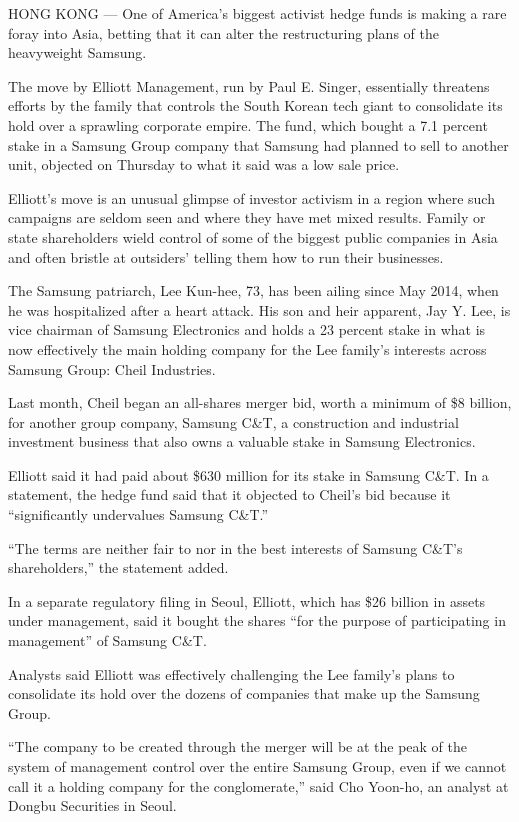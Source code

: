 HONG KONG --- One of America's biggest activist hedge funds is making a
rare foray into Asia, betting that it can alter the restructuring plans
of the heavyweight Samsung.

The move by Elliott Management, run by Paul E. Singer, essentially
threatens efforts by the family that controls the South Korean tech
giant to consolidate its hold over a sprawling corporate empire. The
fund, which bought a 7.1 percent stake in a Samsung Group company that
Samsung had planned to sell to another unit, objected on Thursday to
what it said was a low sale price.

Elliott's move is an unusual glimpse of investor activism in a region
where such campaigns are seldom seen and where they have met mixed
results. Family or state shareholders wield control of some of the
biggest public companies in Asia and often bristle at outsiders' telling
them how to run their businesses.

The Samsung patriarch, Lee Kun-hee, 73, has been ailing since May 2014,
when he was hospitalized after a heart attack. His son and heir
apparent, Jay Y. Lee, is vice chairman of Samsung Electronics and holds
a 23 percent stake in what is now effectively the main holding company
for the Lee family's interests across Samsung Group: Cheil Industries.

Last month, Cheil began an all-shares merger bid, worth a minimum of \$8
billion, for another group company, Samsung C\&T, a construction and
industrial investment business that also owns a valuable stake in
Samsung Electronics.

Elliott said it had paid about \$630 million for its stake in Samsung
C\&T. In a statement, the hedge fund said that it objected to Cheil's
bid because it ``significantly undervalues Samsung C\&T.''

``The terms are neither fair to nor in the best interests of Samsung
C\&T's shareholders,'' the statement added.

In a separate regulatory filing in Seoul, Elliott, which has \$26
billion in assets under management, said it bought the shares ``for the
purpose of participating in management'' of Samsung C\&T.

Analysts said Elliott was effectively challenging the Lee family's plans
to consolidate its hold over the dozens of companies that make up the
Samsung Group.

``The company to be created through the merger will be at the peak of
the system of management control over the entire Samsung Group, even if
we cannot call it a holding company for the conglomerate,'' said Cho
Yoon-ho, an analyst at Dongbu Securities in Seoul.

